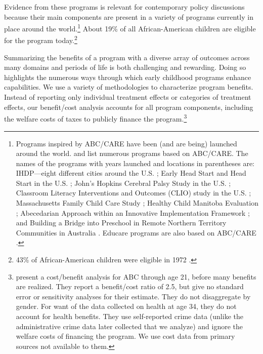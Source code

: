 Evidence from these programs is relevant for contemporary policy discussions because their main components are present in a variety of programs currently in place around the world.\footnote{Programs inspired by ABC/CARE have been (and are being) launched around the world. \citet{Sparling_2010_Highlights} and \citet{Ramey_Ramey_Lanzi_2014_Interventions} list numerous programs based on ABC/CARE. The names of the programs with years launched and locations in parentheses are: IHDP---eight different cities around the U.S. \citep{Spiker-etal_1997_Helping}; Early Head Start and Head Start in the U.S. \citep{Schneider_McDonald-eds_2007_Scale-Up_Vol-1}; John's Hopkins Cerebral Palsy Study in the U.S. \citep{Sparling_2010_Highlights}; Classroom Literacy Interventions and Outcomes (CLIO) study in the U.S. \citep{Sparling_2010_Highlights}; Massachusetts Family Child Care Study \citep{Collins_etal_2010_Massachusetts-Study}; Healthy Child Manitoba Evaluation \citep{Healthy_Child_Manitoba_2015_Starting-Early}; Abecedarian Approach within an Innovative Implementation Framework \citep{Jensen_Nielsen_2016_ABC-Programme-Pilot}; and Building a Bridge into Preschool in Remote Northern Territory Communities in Australia \citep{UMonash_Dataset_2015_URL}. Educare programs are also based on ABC/CARE \citep{Educare_2014_Research_Agenda,Yazejian_Bryant_2012_Educare}.} About 19\% of all African-American children are eligible for the program today.\footnote{43\% of African-American children were eligible in 1972 \citep{Garcia_2016_National-Implementation-ECI}.}

Summarizing the benefits of a program with a diverse array of outcomes across many domains and periods of life is both challenging and rewarding. Doing so highlights the numerous ways through which early childhood programs enhance capabilities. We use a variety of methodologies to characterize program benefits. Instead of reporting only individual treatment effects or categories of treatment effects, our benefit/cost analysis accounts for all program components, including the welfare costs of taxes to publicly finance the program.\footnote{\cite{Barnett_Masse_2002_benefitcost,Barnett_Masse_2007_EER} present a cost/benefit analysis for ABC through age 21, before many benefits are realized. They report a benefit/cost ratio of 2.5, but give no standard error or sensitivity analyses for their estimate. They do not disaggregate by gender. For want of the data collected on health at age 34, they do not account for health benefits. They use self-reported crime data (unlike the administrative crime data later collected that we analyze) and ignore the welfare costs of financing the program. We use cost data from primary sources not available to them.}

